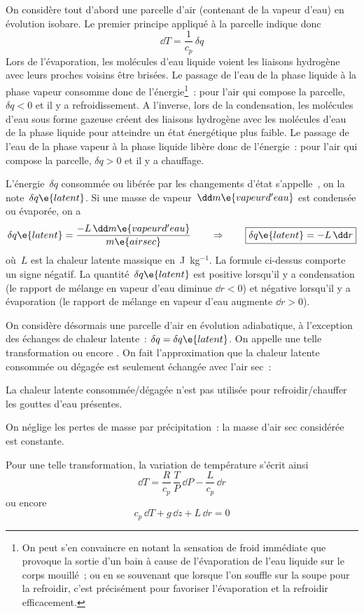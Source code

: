 \sk
On considère tout d'abord une parcelle d'air (contenant de la vapeur d'eau) en évolution isobare. Le premier principe appliqué à la parcelle indique donc
\[ \dd T = \frac{1}{c_p} \, \delta q \]
Lors de l'évaporation, les molécules d'eau liquide voient les liaisons hydrogène avec leurs proches voisins être brisées. Le passage de l'eau de la phase liquide à la phase vapeur consomme donc de l'énergie\footnote{On peut s'en convaincre en notant la sensation de froid immédiate que provoque la sortie d'un bain à cause de l'évaporation de l'eau liquide sur le corps mouillé~; ou en se souvenant que lorsque l'on souffle sur la soupe pour la refroidir, c'est précisément pour favoriser l'évaporation et la refroidir efficacement.}~: pour l'air qui compose la parcelle, $\delta q < 0$ et il y a refroidissement. 
A l'inverse, lors de la condensation, les molécules d'eau sous forme gazeuse créent des liaisons hydrogène avec les molécules d'eau de la phase liquide pour atteindre un état énergétique plus faible. Le passage de l'eau de la phase vapeur à la phase liquide libère donc de l'énergie~: pour l'air qui compose la parcelle, $\delta q > 0$ et il y a chauffage.

\sk
L'énergie~$\delta q$ consommée ou libérée par les changements d'état s'appelle~, on la note~$\delta q\e{latent}$. Si une masse de vapeur~$\dd m\e{vapeur d'eau}$ est condensée ou évaporée, on a
\[ \delta q\e{latent} = \frac{- L \, \dd m\e{vapeur d'eau}}{m\e{air sec}} \qquad \Rightarrow \qquad \boxed{ \delta q\e{latent} = - L \, \dd r } \]
où~$L$ est la chaleur latente massique en~J~kg$^{-1}$. La formule ci-dessus comporte un signe négatif. La quantité~$\delta q\e{latent}$ est positive lorsqu'il y a condensation (le rapport de mélange en vapeur d'eau diminue $\dd r < 0$) et négative lorsqu'il y a évaporation (le rapport de mélange en vapeur d'eau augmente $\dd r > 0$).

\sk
On considère désormais une parcelle d'air en évolution adiabatique, à l'exception des échanges de chaleur latente~: $\delta q = \delta q\e{latent}$. On appelle une telle transformation  ou encore . On fait l'approximation que la chaleur latente consommée ou dégagée est seulement échangée avec l'air sec~:
\begin{citemize}
\item La chaleur latente consommée/dégagée n'est pas utilisée pour refroidir/chauffer les gouttes d'eau présentes.
\item On néglige les pertes de masse par précipitation~: la masse d'air sec considérée est constante.
\end{citemize}
Pour une telle transformation, la variation de température s'écrit ainsi
\[ \dd T = \frac{R}{c_p} \, \frac{T}{P} \, \dd P - \frac{L}{c_p} \, \dd r \]
\noindent ou encore
\[ c_p \, \dd T + g \, \dd z + L \, \dd r = 0 \]
